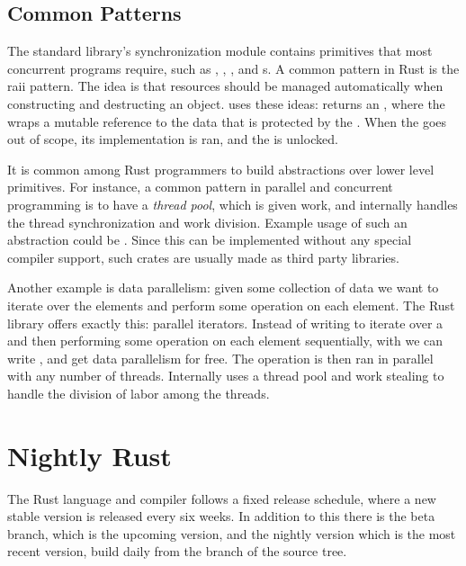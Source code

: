 \subsection{Common Patterns}

The standard library's synchronization module  contains primitives that most
concurrent programs require, such as , , , and
s. A common pattern in Rust is the \gls{raii} pattern. The idea is that resources
should be managed automatically when constructing and destructing an object.  uses
these ideas:  returns an , where the 
wraps a mutable reference to the data that is protected by the . When the
 goes out of scope, its  implementation is ran, and the  is
unlocked.

It is common among Rust programmers to build abstractions over lower level primitives. For
instance, a common pattern in parallel and concurrent programming is to have a \emph{thread pool},
which is given work, and internally handles the thread synchronization and work division. Example
usage of such an abstraction could be .
Since this can be implemented without any special compiler support, such crates are usually made as
third party libraries.

Another example is data parallelism: given some collection of data we want to iterate over the
elements and perform some operation on each element. The Rust library  offers exactly
this: parallel iterators. Instead of writing  to iterate over a  and
then performing some operation on each element sequentially, with  we can write
, and get data parallelism for free. The operation is then ran in parallel
with any number of threads. Internally  uses a thread pool and work stealing to handle
the division of labor among the threads.


\section{Nightly Rust}

The Rust language and compiler follows a fixed release schedule, where a new stable version is
released every six weeks. In addition to this there is the beta branch, which is the upcoming
version, and the nightly version which is the most recent version, build daily from the
 branch of the source tree.

